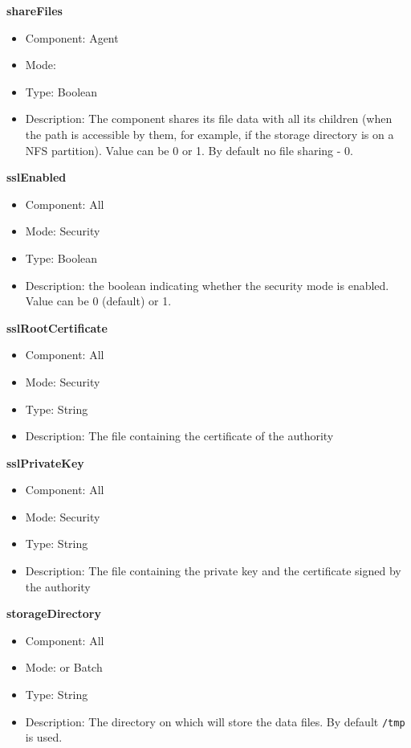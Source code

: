 \begin{description}
\item{\bf{shareFiles}}
  \begin{itemize}
  \item Component: Agent
  \item Mode: \dagda
  \item Type: Boolean
  \item Description: The \dagda component shares its file data with all its children
(when the path is accessible by them, for example, if the storage directory is
on a NFS partition). Value can be 0 or 1.  By default no file sharing - 0.
  \end{itemize}
  
\item{\bf{sslEnabled}  \label{appendix_ssl}}
  \begin{itemize}
    \item Component: All
    \item Mode: Security
    \item Type: Boolean
    \item Description: the boolean indicating whether the security mode is enabled.
      Value can be 0 (default) or 1.
  \end{itemize}

\item{\bf{sslRootCertificate}}
  \begin{itemize}
  \item Component: All
  \item Mode: Security
  \item Type: String
  \item Description: The file containing the certificate of the authority
  \end{itemize}
  
\item{\bf{sslPrivateKey}}
  \begin{itemize}
  \item Component: All
  \item Mode: Security
  \item Type: String
  \item Description: The file containing the private key and the certificate signed by the authority
  \end{itemize}
  

\item{\bf{storageDirectory}}
  \begin{itemize}
  \item Component: All
  \item Mode: \dagda or Batch
  \item Type: String
  \item Description: The directory on which \dagda will store the data files.
  By default \texttt{/tmp} is used.
  \end{itemize}



\end{description}
